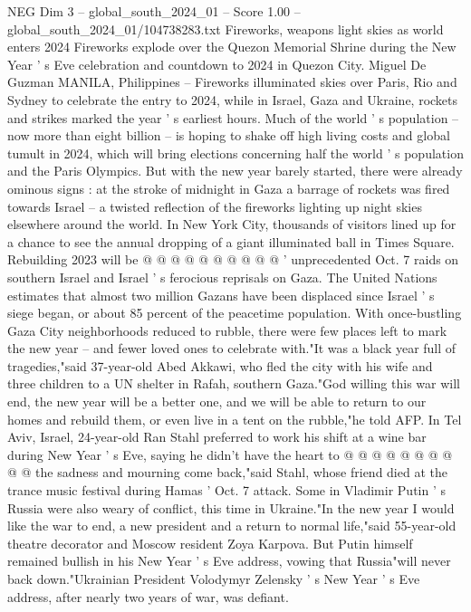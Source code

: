 \begin{textsample}{NEG Dim 3 – global\_south\_2024\_01 – Score 1.00 – global\_south\_2024\_01/104738283.txt}  \label{ex:f3_neg_105}
Fireworks, weapons light skies as world enters 2024 Fireworks explode over the Quezon Memorial Shrine during the New Year ' s Eve celebration and countdown to 2024 in Quezon City.
Miguel De Guzman MANILA, Philippines -- Fireworks illuminated skies over Paris, Rio and Sydney to celebrate the entry to 2024, while in Israel, Gaza and Ukraine, rockets and strikes marked the year ' s earliest hours.
Much of the world ' s population -- now more than eight billion -- is hoping to shake off high living costs and global tumult in 2024, which will bring elections concerning half the world ' s population and the Paris Olympics.
But with the new year barely started, there were already ominous signs : at the stroke of midnight in Gaza a barrage of rockets was fired towards Israel -- a twisted reflection of the fireworks lighting up night skies elsewhere around the world.
In New York City, thousands of visitors lined up for a chance to see the annual dropping of a giant illuminated ball in Times Square.
Rebuilding 2023 will be @ @ @ @ @ @ @ @ @ @ ' unprecedented Oct. 7 raids on southern Israel and Israel ' s ferocious reprisals on Gaza.
The United Nations estimates that almost two million Gazans have been displaced since Israel ' s siege began, or about 85 percent of the peacetime population.
With once-bustling Gaza City neighborhoods reduced to rubble, there were few places left to mark the new year -- and fewer loved ones to celebrate with."It was a black year full of tragedies,"said 37-year-old Abed Akkawi, who fled the city with his wife and three children to a UN shelter in Rafah, southern Gaza."God willing this war will end, the new year will be a better one, and we will be able to return to our homes and rebuild them, or even live in a tent on the rubble,"he told AFP.
In Tel Aviv, Israel, 24-year-old Ran Stahl preferred to work his shift at a wine bar during New Year ' s Eve, saying he didn't have the heart to @ @ @ @ @ @ @ @ @ @ the sadness and mourning come back,"said Stahl, whose friend died at the trance music festival during Hamas ' Oct. 7 attack.
Some in Vladimir Putin ' s Russia were also weary of conflict, this time in Ukraine."In the new year I would like the war to end, a new president and a return to normal life,"said 55-year-old theatre decorator and Moscow resident Zoya Karpova.
But Putin himself remained bullish in his New Year ' s Eve address, vowing that Russia"will never back down."Ukrainian President Volodymyr Zelensky ' s New Year ' s Eve address, after nearly two years of war, was defiant.

\end{textsample}
